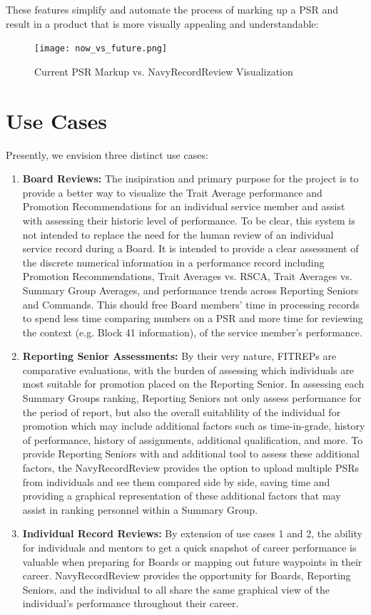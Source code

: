 \documentclass[UTF8]{article}
\begin{document}
\newpage

These features simplify and automate the process of marking up a PSR and result 
in a product that is more visually appealing and understandable:

\begin{figure}[h!]
  \centering
  \texttt{[image: now\_vs\_future.png]}
  \caption{Current PSR Markup vs. NavyRecordReview Visualization}
\end{figure}


\section{Use Cases}
Presently, we envision three distinct use cases:
\begin{enumerate}
  \item \textbf{Board Reviews:} The insipiration and primary purpose for the 
  project is to provide a better way to visualize the Trait Average performance 
  and Promotion Recommendations for an individual service member and assist with 
  assessing their historic level of performance. To be clear, this system is not 
  intended to replace the need for the human review of an individual service 
  record during a Board. It is intended to provide a clear assessment of the 
  discrete numerical information in a performance record including Promotion 
  Recommendations, Trait Averages vs. RSCA, Trait Averages vs. Summary Group 
  Averages, and performance trends across Reporting Seniors and Commands. This
  should free Board members' time in processing records to spend less time
  comparing numbers on a PSR and more time for reviewing the context (e.g. 
  Block 41 information), of the service member's performance.
  \item \textbf{Reporting Senior Assessments:} By their very nature, FITREPs are 
  comparative evaluations, with the burden of assessing which individuals are 
  most suitable for promotion placed on the Reporting Senior. In assessing each 
  Summary Groups ranking, Reporting Seniors not only assess performance for the 
  period of report, but also the overall suitablility of the individual for 
  promotion which may include additional factors such as time-in-grade, history 
  of performance, history of assignments, additional qualification, and more. To 
  provide Reporting Seniors with and additional tool to assess these additional 
  factors, the NavyRecordReview provides the option to upload multiple PSRs from
  individuals and see them compared side by side, saving time and providing a
  graphical representation of these additional factors that may assist in ranking
  personnel within a Summary Group.
  \item \textbf{Individual Record Reviews:} By extension of use cases 1 and 2, the
  ability for individuals and mentors to get a quick snapshot of career 
  performance is valuable when preparing for Boards or mapping out future
  waypoints in their career. NavyRecordReview provides the opportunity for 
  Boards, Reporting Seniors, and the individual to all share the same graphical
  view of the individual's performance throughout their career.
\end{enumerate}
\end{document}
